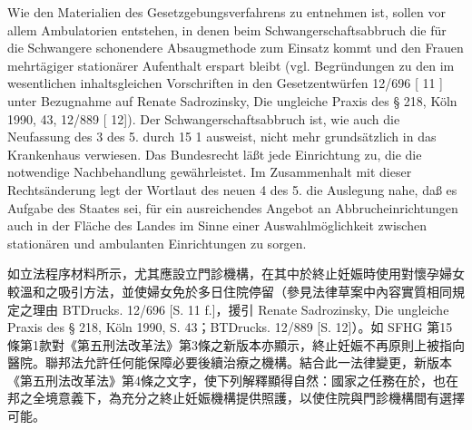 \documentclass[12pt]{article}
\begin{document}
\begin{sourcepara}[title={原文E.237}]
Wie den Materialien des Gesetzgebungsverfahrens zu entnehmen ist, sollen vor allem Ambulatorien entstehen, in denen beim Schwangerschaftsabbruch die für die Schwangere schonendere Absaugmethode zum Einsatz kommt und den Frauen mehrtägiger stationärer Aufenthalt erspart bleibt (vgl. Begründungen zu den im wesentlichen inhaltsgleichen Vorschriften in den Gesetzentwürfen \abbrBTDrucks{} 12/696 [\abbrS{} 11 \abbrF{}] unter Bezugnahme auf Renate Sadrozinsky, Die ungleiche Praxis des § 218, Köln 1990, \abbrS{} 43, \abbrBTDrucks{} 12/889 [\abbrS{} 12]). Der Schwangerschaftsabbruch ist, wie auch die Neufassung des \abbrArt{} 3 des 5. \abbrStrRG{} durch \abbrArt{} 15 \abbrNr{} 1 \abbrSFHG{} ausweist, nicht mehr grundsätzlich in das Krankenhaus verwiesen. Das Bundesrecht läßt jede Einrichtung zu, die die notwendige Nachbehandlung gewährleistet. Im Zusammenhalt mit dieser Rechtsänderung legt der Wortlaut des neuen \abbrArt{} 4 des 5. \abbrStrRG{} die Auslegung nahe, daß es Aufgabe des Staates sei, für ein ausreichendes Angebot an Abbrucheinrichtungen auch in der Fläche des Landes im Sinne einer Auswahlmöglichkeit zwischen stationären und ambulanten Einrichtungen zu sorgen.
\end{sourcepara}
\begin{transpara}
如立法程序材料所示，尤其應設立門診機構，在其中於終止妊娠時使用對懷孕婦女較溫和之吸引方法，並使婦女免於多日住院停留（參見法律草案中內容實質相同規定之理由 BTDrucks. 12/696 [S. 11 f.]，援引 Renate Sadrozinsky, Die ungleiche Praxis des § 218, Köln 1990, S. 43；BTDrucks. 12/889 [S. 12]）。如 SFHG 第15條第1款對《第五刑法改革法》第3條之新版本亦顯示，終止妊娠不再原則上被指向醫院。聯邦法允許任何能保障必要後續治療之機構。結合此一法律變更，新版本《第五刑法改革法》第4條之文字，使下列解釋顯得自然：國家之任務在於，也在邦之全境意義下，為充分之終止妊娠機構提供照護，以使住院與門診機構間有選擇可能。
\end{transpara}
\end{document}

